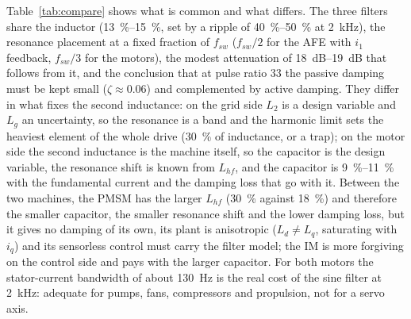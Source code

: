 \documentclass[10pt,a4paper]{scrartcl}
\newcommand{\fsw}{f_{sw}}
\newcommand{\Lhf}{L_{hf}}
\newcommand{\Lg}{L_{g}}
\begin{document}
\begin{onehalfspace}
Table~\ref{tab:compare} shows what is common and what differs. The three filters share the inductor (\SIrange{13}{15}{\percent}, set by a ripple of \SIrange{40}{50}{\percent} at \SI{2}{kHz}), the resonance placement at a fixed fraction of $\fsw$ ($\fsw/2$ for the AFE with $i_1$ feedback, $\fsw/3$ for the motors), the modest attenuation of \SIrange{18}{19}{dB} that follows from it, and the conclusion that at pulse ratio 33 the passive damping must be kept small ($\zeta \approx 0.06$) and complemented by active damping. They differ in what fixes the second inductance: on the grid side $L_2$ is a design variable and $\Lg$ an uncertainty, so the resonance is a band and the harmonic limit sets the heaviest element of the whole drive (\SI{30}{\percent} of inductance, or a trap); on the motor side the second inductance is the machine itself, so the capacitor is the design variable, the resonance shift is known from $\Lhf$, and the capacitor is \SIrange{9}{11}{\percent} with the fundamental current and the damping loss that go with it. Between the two machines, the PMSM has the larger $\Lhf$ (\SI{30}{\percent} against \SI{18}{\percent}) and therefore the smaller capacitor, the smaller resonance shift and the lower damping loss, but it gives no damping of its own, its plant is anisotropic ($L_d \ne L_q$, saturating with $i_q$) and its sensorless control must carry the filter model; the IM is more forgiving on the control side and pays with the larger capacitor. For both motors the stator-current bandwidth of about \SI{130}{Hz} is the real cost of the sine filter at \SI{2}{kHz}: adequate for pumps, fans, compressors and propulsion, not for a servo axis.

\end{onehalfspace}
\end{document}
